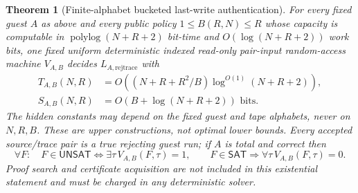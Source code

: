 \documentclass[11pt]{article}
\newtheorem{theorem}{Theorem}
\newcommand{\SAT}{\mathsf{SAT}}
\newcommand{\UNSAT}{\mathsf{UNSAT}}
\begin{document}
\begin{theorem}[Finite-alphabet bucketed last-write authentication]\label{th:block}
For every fixed guest $A$ as above and every public policy $1\le B(R,N)\le R$ whose capacity is computable in $\operatorname{polylog}(N+R+2)$ bit-time and $O(\log(N+R+2))$ work bits, one fixed uniform deterministic \emph{indexed read-only pair-input} random-access machine $V_{A,B}$ decides $L_{A,\mathrm{rejtrace}}$ with
\begin{align}
 T_{A,B}(N,R)&=O\left((N+R+R^2/B)\log^{O(1)}(N+R+2)\right),\label{eq:T}\\
 S_{A,B}(N,R)&=O\left(B+\log(N+R+2)\right)\text{ bits}.\label{eq:S}
\end{align}
The hidden constants may depend on the fixed guest and tape alphabets, never on $N,R,B$. These are upper constructions, not optimal lower bounds. Every accepted source/trace pair is a true rejecting guest run; if $A$ is total and correct then
\[
 \forall F:\quad F\in\UNSAT\Longleftrightarrow
 \exists\tau\,V_{A,B}(F,\tau)=1,\qquad
 F\in\SAT\Longrightarrow\forall\tau\,V_{A,B}(F,\tau)=0 .
\]
Proof search and certificate acquisition are not included in this existential statement and must be charged in any deterministic solver.
\end{theorem}
\end{document}
